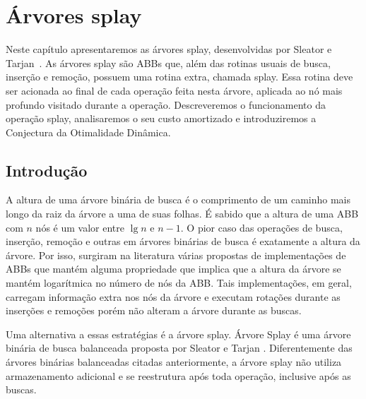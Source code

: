 
\chapter{Árvores splay}
\label{cap:arvores-splay}

\newtheorem{caso}{Caso}

Neste capítulo apresentaremos as árvores splay, desenvolvidas por Sleator e Tarjan~\cite{selfadjustingbst}. As árvores splay são ABBs que, além das rotinas usuais de busca, inserção e remoção, possuem uma rotina extra, chamada splay. Essa rotina deve ser acionada ao final de cada operação feita nesta árvore, aplicada ao nó mais profundo visitado durante a operação. Descreveremos o funcionamento da operação splay, analisaremos o seu custo amortizado e introduziremos a Conjectura da Otimalidade Dinâmica.


\section{Introdução}
A altura de uma árvore binária de busca é o comprimento de um caminho mais longo da raiz da árvore a uma de suas folhas. É sabido que a altura de uma ABB com $n$ nós é um valor entre $\lg n$ e $n-1$. O pior caso das operações de busca, inserção, remoção e outras em árvores binárias de busca é exatamente a altura da árvore. Por isso, surgiram na literatura várias propostas de implementações de ABBs que mantém alguma propriedade que implica que a altura da árvore se mantém logarítmica no número de nós da ABB. Tais implementações, em geral, carregam informação extra nos nós da árvore e executam rotações durante as inserções e remoções porém não alteram a árvore durante as buscas.

Uma alternativa a essas estratégias é a árvore splay. Árvore Splay é uma árvore binária de busca balanceada proposta por Sleator e Tarjan \cite{selfadjustingbst}. Diferentemente das árvores binárias balanceadas citadas anteriormente, a árvore splay não utiliza armazenamento adicional e se reestrutura após toda operação, inclusive após as buscas.



